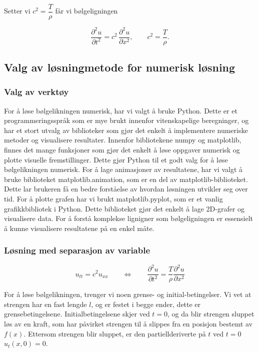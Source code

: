 Setter vi \(c^2=\dfrac{T}{\rho}\) får vi bølgeligningen

\begin{equation}
  \frac{\partial^2 u}{\partial t^2}
  = c^2\,\frac{\partial^2 u}{\partial x^2},
  \qquad
  c^2=\frac{T}{\rho}.
  \label{eq:utledetBolgelikning}
\end{equation}

\subsection{Valg av løsningmetode for numerisk løsning}
\subsubsection{Valg av verktøy}
For å løse bølgelikningen numerisk, har vi valgt å bruke Python. Dette er et programmeringsspråk som er mye brukt innenfor vitenskapelige
beregninger, og har et stort utvalg av biblioteker som gjør det enkelt å implementere numeriske metoder og visualisere resultater. Innenfor 
bibliotekene numpy og matplotlib, finnes det mange funksjoner som gjør det enkelt å løse oppgaver numerisk og plotte visuelle fremstillinger.
Dette gjør Python til et godt valg for å løse bølgelikningen numerisk. For å lage animasjoner av resultatene, har vi valgt å bruke biblioteket 
matplotlib.animation, som er en del av matplotlib-biblioteket. Dette lar brukeren få en bedre forståelse av hvordan løsningen utvikler seg over tid.
For å plotte grafen har vi brukt matplotlib.pyplot, som er et vanlig grafikkbibliotek i Python. Dette biblioteket gjør det enkelt å lage 2D-grafer og 
visualisere data. For å forstå komplekse lignigner som bølgeligningen er essensielt å kunne visualisere resultatene på en enkel måte.

\subsubsection{Løsning med separasjon av variable}
\begin{equation}
	u_{tt} = c^2 u_{xx} \qquad \iff \qquad 
	\frac{\partial^2 u}{\partial t^2} = \frac{T}{\rho} \frac{\partial^2 u}{\partial x^2}	
	\label{eq:bølgelikningForLøsning}
\end{equation}

For å løse bølgelikningen, trenger vi noen grense- og initial-betingelser. Vi vet at strengen har en fast lengde $l$,
og er festet i begge ender, dette er grensebetingelsene. Initialbetingelsene skjer ved $t=0$, og da blir strengen
sluppet løs av en kraft, som har påvirket strengen til å slippes fra en posisjon bestemt av $f(x)$.
Ettersom strengen blir sluppet, er den partiellderiverte på $t$ ved $t=0$ $u_t(x,0) = 0$.

